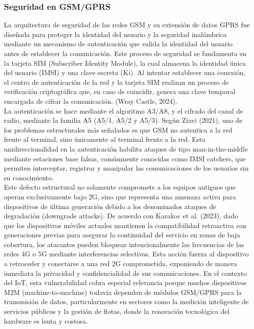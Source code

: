 \documentclass[12pt,a4paper]{article}
\begin{document}
	\subsubsection{Seguridad en GSM/GPRS}
	
	La arquitectura de seguridad de las redes GSM y su extensión de datos GPRS fue diseñada para proteger la identidad del usuario y la seguridad inalámbrica mediante un mecanismo de autenticación que valida la identidad del usuario antes de establecer la comunicación. Este proceso de seguridad se fundamenta en la tarjeta SIM (Subscriber Identity Module), la cual almacena la identidad única del usuario (IMSI) y una clave secreta (Ki). Al intentar establecer una conexión, el centro de autenticación de la red y la tarjeta SIM realizan un proceso de verificación criptográfica que, en caso de coincidir, genera una clave temporal encargada de cifrar la comunicación. (Wray Castle, 2024).\\
	
	La autenticación se hace mediante el algoritmo A3/A8, y el cifrado del canal de radio, mediante la familia A5 (A5/1, A5/2 y A5/3). Según Ziavi (2021), uno de los problemas estructurales más señalados es que GSM no autentica a la red frente al terminal, sino únicamente al terminal frente a la red. Esta unidireccionalidad en la autenticación habilita ataques de tipo man-in-the-middle mediante estaciones base falsas, comúnmente conocidas como IMSI catchers, que permiten interceptar, registrar y manipular las comunicaciones de los usuarios sin su conocimiento.\\
	
	Este defecto estructural no solamente compromete a los equipos antiguos que operan exclusivamente bajo 2G, sino que representa una amenaza activa para dispositivos de última generación debido a los denominados ataques de degradación (downgrade attacks). De acuerdo con Karakoc et al. (2023), dado que los dispositivos móviles actuales mantienen la compatibilidad retroactiva con generaciones previas para asegurar la continuidad del servicio en zonas de baja cobertura, los atacantes pueden bloquear intencionalmente las frecuencias de las redes 4G o 5G mediante interferencias selectivas. Esta acción fuerza al dispositivo a retroceder y conectarse a una red 2G comprometida, exponiendo de manera inmediata la privacidad y confidencialidad de sus comunicaciones. En el contexto del IoT, esta vulnerabilidad cobra especial relevancia porque muchos dispositivos M2M (machine-to-machine) todavía dependen de módulos GSM/GPRS para la transmisión de datos, particularmente en sectores como la medición inteligente de servicios públicos y la gestión de flotas, donde la renovación tecnológica del hardware es lenta y costosa.\\
\end{document}
